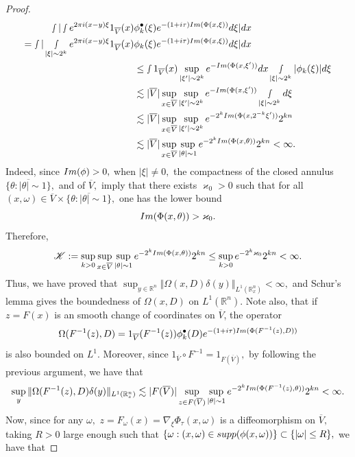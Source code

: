 \documentclass[10pt,a4paper]{amsart}
\begin{document}
\begin{proof}
\begin{align*}
    \smallint|\smallint e^{2\pi i(x-y)\xi}1_{\overline{V}}(x) &\phi_{k}^\bullet(\xi)e^{-(1+i\tau)\textnormal{Im}(\Phi(x,\xi))}d\xi|dx \\
   = \smallint|\smallint_{|\xi|\sim 2^k} e^{2\pi i(x-y)\xi}1_{\overline{V}}(x) &\phi_{k}(\xi)e^{-(1+i\tau)\textnormal{Im}(\Phi(x,\xi))}d\xi|dx \\
    &\leq \smallint   1_{\overline{V}}(x)\sup_{|\xi'|\sim 2^{k}}e^{-\textnormal{Im}(\Phi(x,\xi'))} dx\smallint_{|\xi|\sim 2^{k}}|\phi_{k}(\xi)| d\xi\\
    &\lesssim |\overline{V}|\sup_{x\in \overline{V}} \sup_{|\xi'|\sim 2^{k}}e^{-\textnormal{Im}(\Phi(x,\xi'))}\smallint_{|\xi|\sim 2^{k}}d\xi\\
    &\lesssim |\overline{V}|\sup_{x\in \overline{V}} \sup_{|\xi'|\sim 2^{k}}e^{-2^{k}\textnormal{Im}(\Phi(x,2^{-k}\xi'))}2^{kn}\\
    & \lesssim |\overline{V}|\sup_{x\in \overline{V}} \sup_{|\theta|\sim 1}e^{-2^{k}\textnormal{Im}(\Phi(x,\theta))}2^{kn}<\infty.
\end{align*}Indeed, since $\textnormal{Im}(\phi)> 0,$ when $|\xi|\neq 0,$ the compactness of the closed annulus $\overline{\{\theta: |\theta|\sim 1\}},$ and of $\overline{V},$ imply that there exists $\varkappa_0>0$ such that for all $(x,\omega)\in \overline{V}\times \overline{\{\theta: |\theta|\sim 1\}},$ one has the lower bound $$\textnormal{Im}(\Phi(x,\theta))>\varkappa_0.$$ Therefore, 
$$\mathscr{K}:=\sup_{k>0}\sup_{x\in \overline{V}} \sup_{|\theta|\sim 1}e^{-2^{k}\textnormal{Im}(\Phi(x,\theta))}2^{kn}\leq \sup_{k>0} e^{-2^{k}\varkappa_0}2^{kn}<\infty.$$
Thus, we have proved that  $\sup_{y\in \mathbb{R}^n}\Vert  \Omega(x,D)\delta(y) \Vert_{L^1(\mathbb{R}^n_x)}<\infty,$ and Schur's lemma gives the boundedness of $\Omega(x,D)$ on $L^1(\mathbb{R}^n).$ Note also, that if $z=F(x)$ is an smooth change of coordinates on $\overline{V}$, the operator $$\Omega(F^{-1}(z),D)=1_{\overline{V}}(F^{-1}(z))\phi_{k}^\bullet(D)e^{-(1+i\tau)\textnormal{Im}(\Phi(F^{-1}(z),D))}$$ is also bounded on $L^1.$ Moreover, since $1_{\overline{V}}\circ F^{-1}=1_{F(\overline{V})},$ by following the previous argument, we have that
\begin{align*}
   \sup_{y}  \Vert \Omega(F^{-1}(z),D)\delta(y)\Vert_{L^1(\mathbb{R}^n_z)}\lesssim  |F(\overline{V})|\sup_{z\in F(\overline{V})} \sup_{|\theta|\sim 1}e^{-2^{k}\textnormal{Im}(\Phi(F^{-1}(z),\theta))}2^{kn}<\infty.
\end{align*}Now, since for any $\omega,$ $z=F_\omega(x)=\nabla_\xi\Phi_\tau(x,\omega)$ is a diffeomorphism on $\overline{V},$ taking $R>0$ large enough such that $\{\omega: (x,\omega)\in \textnormal{supp}(\phi(x,\omega))\}\subset\{|\omega|\leq R\},$ we have that

\end{proof}
\end{document}
